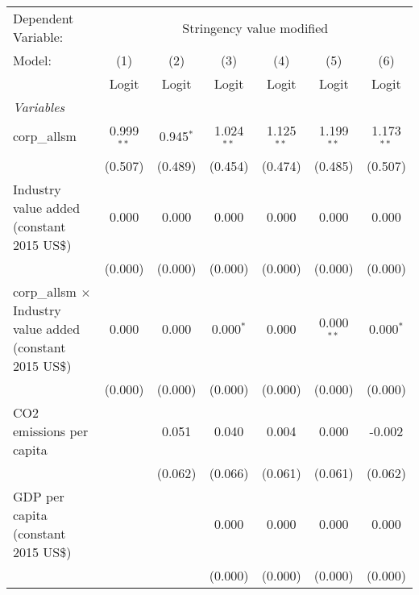 
\begingroup
\centering
\begin{tabular}{lcccccc}
   \toprule
   Dependent Variable: & \multicolumn{6}{c}{Stringency value modified}\\
   Model:                                                            & (1)          & (2)         & (3)          & (4)          & (5)          & (6)\\  
                                                                     &  Logit       & Logit       & Logit        & Logit        & Logit        & Logit\\  
   \midrule
   \emph{Variables}\\
   corp\_allsm                                                       & 0.999$^{**}$ & 0.945$^{*}$ & 1.024$^{**}$ & 1.125$^{**}$ & 1.199$^{**}$ & 1.173$^{**}$\\   
                                                                     & (0.507)      & (0.489)     & (0.454)      & (0.474)      & (0.485)      & (0.507)\\   
   Industry value added (constant 2015 US\$)                         & 0.000        & 0.000       & 0.000        & 0.000        & 0.000        & 0.000\\   
                                                                     & (0.000)      & (0.000)     & (0.000)      & (0.000)      & (0.000)      & (0.000)\\   
   corp\_allsm $\times$ Industry value added (constant 2015 US\$)    & 0.000        & 0.000       & 0.000$^{*}$  & 0.000        & 0.000$^{**}$ & 0.000$^{*}$\\   
                                                                     & (0.000)      & (0.000)     & (0.000)      & (0.000)      & (0.000)      & (0.000)\\   
   CO2 emissions per capita                                          &              & 0.051       & 0.040        & 0.004        & 0.000        & -0.002\\   
                                                                     &              & (0.062)     & (0.066)      & (0.061)      & (0.061)      & (0.062)\\   
   GDP per capita (constant 2015 US\$)                               &              &             & 0.000        & 0.000        & 0.000        & 0.000\\   
                                                                     &              &             & (0.000)      & (0.000)      & (0.000)      & (0.000)\\   

\end{tabular}
